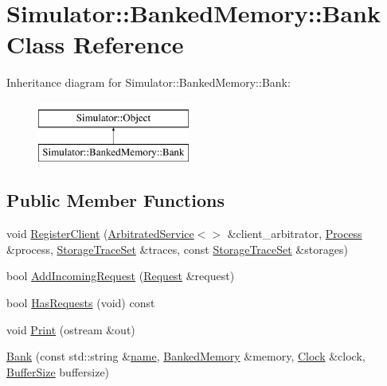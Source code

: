 \hypertarget{class_simulator_1_1_banked_memory_1_1_bank}{\section{Simulator\+:\+:Banked\+Memory\+:\+:Bank Class Reference}
\label{class_simulator_1_1_banked_memory_1_1_bank}
}
Inheritance diagram for Simulator\+:\+:Banked\+Memory\+:\+:Bank\+:\begin{figure}[H]
\begin{center}
\leavevmode
\includegraphics[height=2.000000cm]{class_simulator_1_1_banked_memory_1_1_bank}
\end{center}
\end{figure}
\subsection*{Public Member Functions}
\begin{DoxyCompactItemize}
\item 
void \hyperlink{class_simulator_1_1_banked_memory_1_1_bank_a17d1ba65e7fae349507e7184c6d72dbf}{Register\+Client} (\hyperlink{class_simulator_1_1_arbitrated_service}{Arbitrated\+Service}$<$$>$ \&client\+\_\+arbitrator, \hyperlink{class_simulator_1_1_process}{Process} \&process, \hyperlink{class_simulator_1_1_storage_trace_set}{Storage\+Trace\+Set} \&traces, const \hyperlink{class_simulator_1_1_storage_trace_set}{Storage\+Trace\+Set} \&storages)
\item 
bool \hyperlink{class_simulator_1_1_banked_memory_1_1_bank_aa04094a38c766de2a4d58e392e6263ae}{Add\+Incoming\+Request} (\hyperlink{struct_simulator_1_1_banked_memory_1_1_request}{Request} \&request)
\item 
bool \hyperlink{class_simulator_1_1_banked_memory_1_1_bank_a9da06e728a98b59c2081729a50cf1664}{Has\+Requests} (void) const 
\item 
void \hyperlink{class_simulator_1_1_banked_memory_1_1_bank_ac37054d967707f69658e7b87f37968c1}{Print} (ostream \&out)
\item 
\hyperlink{class_simulator_1_1_banked_memory_1_1_bank_afb78f52e341cb8032b7a986d0ef22217}{Bank} (const std\+::string \&\hyperlink{mtconf_8c_a8f8f80d37794cde9472343e4487ba3eb}{name}, \hyperlink{class_simulator_1_1_banked_memory}{Banked\+Memory} \&memory, \hyperlink{class_simulator_1_1_clock}{Clock} \&clock, \hyperlink{namespace_simulator_a5ca279f926485be2d0554e41275a3305}{Buffer\+Size} buffersize)
\end{DoxyCompactItemize}


